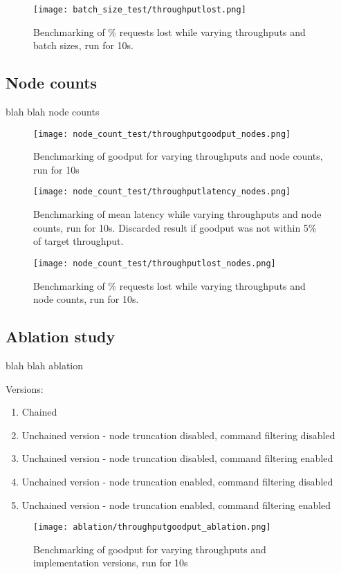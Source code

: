 \begin{figure}[h!]
\centering
\texttt{[image: batch\_size\_test/throughputlost.png]}
\caption{Benchmarking of \% requests lost while varying throughputs and batch sizes, run for 10s.}
\end{figure}

\subsection{Node counts}
blah blah node counts

\begin{figure}[h!]
\centering
\texttt{[image: node\_count\_test/throughputgoodput\_nodes.png]}
\caption{Benchmarking of goodput for varying throughputs and node counts, run for 10s}
\end{figure}

\begin{figure}[h!]
\centering
\texttt{[image: node\_count\_test/throughputlatency\_nodes.png]}
\caption{Benchmarking of mean latency while varying throughputs and node counts, run for 10s. Discarded result if goodput was not within 5\% of target throughput.}
\end{figure}

\begin{figure}[h!]
\centering
\texttt{[image: node\_count\_test/throughputlost\_nodes.png]}
\caption{Benchmarking of \% requests lost while varying throughputs and node counts, run for 10s.}
\end{figure}

\subsection{Ablation study}
blah blah ablation

Versions:
\begin{enumerate}
	\item Chained
	\item Unchained version - node truncation disabled, command filtering disabled
	\item Unchained version - node truncation disabled, command filtering enabled
	\item Unchained version - node truncation enabled, command filtering disabled
	\item Unchained version - node truncation enabled, command filtering enabled
\end{enumerate}

\begin{figure}[h!]
\centering
\texttt{[image: ablation/throughputgoodput\_ablation.png]}
\caption{Benchmarking of goodput for varying throughputs and implementation versions, run for 10s}
\end{figure}


